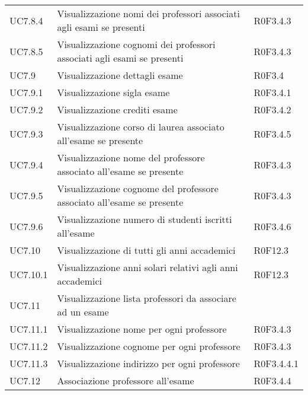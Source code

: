 \documentclass[AnalisiDeiRequisiti.tex]{subfiles}
\begin{document}
\begin{longtable}[H]{p{2cm}p{5cm}p{5cm}}
	UC7.8.4 & Visualizzazione nomi dei professori associati agli esami se presenti & R0F3.4.3 \\
	UC7.8.5 & Visualizzazione cognomi dei professori associati agli esami se presenti & R0F3.4.3 \\
	UC7.9 & Visualizzazione dettagli esame & R0F3.4 \\
	UC7.9.1 & Visualizzazione sigla esame & R0F3.4.1 \\
	UC7.9.2 & Visualizzazione crediti esame & R0F3.4.2 \\
	UC7.9.3 & Visualizzazione corso di laurea associato all'esame se presente & R0F3.4.5 \\
	UC7.9.4 & Visualizzazione nome del professore associato all'esame se presente & R0F3.4.3 \\
	UC7.9.5 & Visualizzazione cognome del professore associato all'esame se presente & R0F3.4.3 \\
	UC7.9.6 & Visualizzazione numero di studenti iscritti all'esame & R0F3.4.6 \\
	UC7.10 & Visualizzazione di tutti gli anni accademici & R0F12.3 \\
	UC7.10.1 & Visualizzazione anni solari relativi agli anni accademici & R0F12.3 \\
	UC7.11 & Visualizzazione lista professori da associare ad un esame &  \\
	UC7.11.1 & Visualizzazione nome per ogni professore & R0F3.4.3 \\
	UC7.11.2 & Visualizzazione cognome per ogni professore & R0F3.4.3 \\
	UC7.11.3 & Visualizzazione indirizzo per ogni professore & R0F3.4.4.1 \\
	UC7.12 & Associazione professore all'esame & R0F3.4.4 \\
	
	
	
	
	

\end{longtable}
\end{document}
